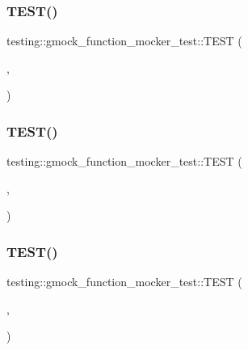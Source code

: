 \subsubsection{\texorpdfstring{TEST()}{TEST()}\hspace{0.1cm}{\footnotesize\ttfamily [3/14]}}
{\footnotesize\ttfamily testing\+::gmock\+\_\+function\+\_\+mocker\+\_\+test\+::\+T\+E\+ST (\begin{DoxyParamCaption}\item[{Mock\+Method\+Template\+Mock\+Test}]{,  }\item[{Method\+With\+Comma\+In\+Return\+Type\+Works}]{ }\end{DoxyParamCaption})}

\mbox{\label{namespacetesting_1_1gmock__function__mocker__test_ab1358739e5588f66cf39320e89464447}} 
\subsubsection{\texorpdfstring{TEST()}{TEST()}\hspace{0.1cm}{\footnotesize\ttfamily [4/14]}}
{\footnotesize\ttfamily testing\+::gmock\+\_\+function\+\_\+mocker\+\_\+test\+::\+T\+E\+ST (\begin{DoxyParamCaption}\item[{Mock\+Method\+Overloaded\+Mock\+Method\+Test}]{,  }\item[{Can\+Overload\+On\+Arg\+Number\+In\+Macro\+Body}]{ }\end{DoxyParamCaption})}

\mbox{\label{namespacetesting_1_1gmock__function__mocker__test_ad88b0b208d03f3e5dee3a164ce33e39c}} 
\subsubsection{\texorpdfstring{TEST()}{TEST()}\hspace{0.1cm}{\footnotesize\ttfamily [5/14]}}
{\footnotesize\ttfamily testing\+::gmock\+\_\+function\+\_\+mocker\+\_\+test\+::\+T\+E\+ST (\begin{DoxyParamCaption}\item[{Mock\+Method\+Overloaded\+Mock\+Method\+Test}]{,  }\item[{Can\+Overload\+On\+Constness\+In\+Macro\+Body}]{ }\end{DoxyParamCaption})}

